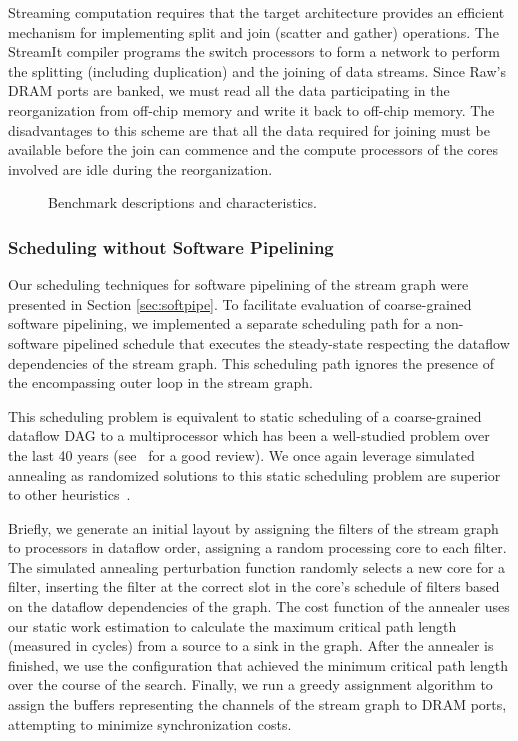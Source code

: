 Streaming computation requires that the target architecture provides
an efficient mechanism for implementing split and join (scatter and
gather) operations.  The StreamIt compiler programs the switch
processors to form a network to perform the splitting (including
duplication) and the joining of data streams.  Since Raw's DRAM ports
are banked, we must read all the data participating in the
reorganization from off-chip memory and write it back to off-chip
memory.  The disadvantages to this scheme are that all the data
required for joining must be available before the join can commence
and the compute processors of the cores involved are idle during the
reorganization.



\begin{figure*}[t]
\centering
{}
\caption{Benchmark descriptions and characteristics.
\protect\label{fig:benchchar}}
\vspace{-6pt}
\end{figure*}

\subsubsection{Scheduling without Software Pipelining}
Our scheduling techniques for software pipelining of the stream graph
were presented in Section \ref{sec:softpipe}.  To facilitate
evaluation of coarse-grained software pipelining, we implemented a
separate scheduling path for a non-software pipelined schedule that
executes the steady-state respecting the dataflow dependencies of the
stream graph.  This scheduling path ignores the presence of the
encompassing outer loop in the stream graph.    

This scheduling problem is equivalent to static scheduling of a
coarse-grained dataflow DAG to a multiprocessor which has been a
well-studied problem over the last 40 years (see~\cite{DAGSched} for a
good review).  We once again leverage simulated annealing as
randomized solutions to this static scheduling problem are superior to
other heuristics~\cite{kwok99fastest}.

Briefly, we generate an initial layout by assigning the filters of the
stream graph to processors in dataflow order, assigning a random
processing core to each filter. The simulated annealing perturbation
function randomly selects a new core for a filter, inserting the
filter at the correct slot in the core's schedule of filters based on
the dataflow dependencies of the graph.  The cost function of the
annealer uses our static work estimation to calculate the maximum
critical path length (measured in cycles) from a source to a sink in
the graph.  After the annealer is finished, we use the configuration
that achieved the minimum critical path length over the course of the
search.  Finally, we run a greedy assignment algorithm to assign the
buffers representing the channels of the stream graph to DRAM ports,
attempting to minimize synchronization costs.

